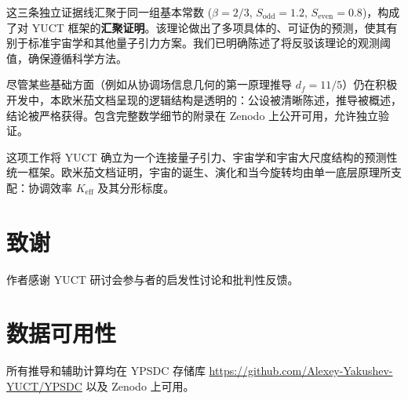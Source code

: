 \documentclass[11pt,a4paper]{article}
\begin{document}
	这三条独立证据线汇聚于同一组基本常数 (\(\beta = 2/3\), \(S_{\mathrm{odd}}=1.2\), \(S_{\mathrm{even}}=0.8\))，构成了对 YUCT 框架的\textbf{汇聚证明}。该理论做出了多项具体的、可证伪的预测，使其有别于标准宇宙学和其他量子引力方案。我们已明确陈述了将反驳该理论的观测阈值，确保遵循科学方法。
	
	尽管某些基础方面（例如从协调场信息几何的第一原理推导 \(d_f = 11/5\)）仍在积极开发中，本欧米茄文档呈现的逻辑结构是透明的：公设被清晰陈述，推导被概述，结论被严格获得。包含完整数学细节的附录在 Zenodo 上公开可用，允许独立验证。
	
	这项工作将 YUCT 确立为一个连接量子引力、宇宙学和宇宙大尺度结构的预测性统一框架。欧米茄文档证明，宇宙的诞生、演化和当今旋转均由单一底层原理所支配：协调效率 \(K_{\mathrm{eff}}\) 及其分形标度。
	
	
	\section*{致谢}
	
	作者感谢 YUCT 研讨会参与者的启发性讨论和批判性反馈。
	
	\section*{数据可用性}
	
	所有推导和辅助计算均在 YPSDC 存储库 \url{https://github.com/Alexey-Yakushev-YUCT/YPSDC} 以及 Zenodo \cite{AppendixL,AppendixY,AppendixP,AppendixM,AppendixΩ,AppendixB} 上可用。
	
\end{document}
